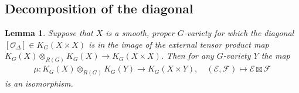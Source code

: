 \documentclass[11pt]{amsart}
\newtheorem{lemma}[dummy]{Lemma}
\theoremstyle{definition}
\newcommand{\Ec}{\mathcal{E}}
\newcommand{\Fc}{\mathcal{F}}
\numberwithin{equation}{subsection}
\numberwithin{figure}{subsection}
\begin{document}
\subsection{Decomposition of the diagonal}


\begin{lemma}
\label{lem:diag-res}
Suppose that $X$ is a smooth, proper $G$-variety for which the diagonal $[\mathcal{O}_\Delta]\in K_G(X\times X)$ is in the image of the external tensor product map $K_G(X)\otimes_{R(G)}K_G(X)\rightarrow K_G(X\times X)$. Then for any $G$-variety $Y$ the map 
\begin{align}
\label{eq:mult-map}
\mu\colon K_G(X)\otimes_{R(G)}K_G(Y)\rightarrow K_G(X\times Y), \quad (\Ec,\Fc)\mapsto \Ec\boxtimes\Fc
\end{align}
is an isomorphism.
\end{lemma}
\end{document}
